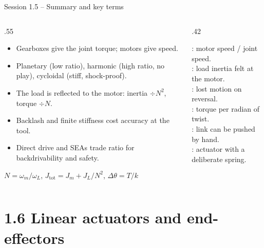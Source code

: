 \documentclass[aspectratio=169,10pt]{beamer}
\begin{document}
\begin{frame}{Session 1.5 -- Summary and key terms}
\begin{columns}[T]
\begin{column}{.55\textwidth}
\small
\begin{itemize}
\item Gearboxes give the joint torque; motors give speed.
\item Planetary (low ratio), harmonic (high ratio, no play), cycloidal (stiff, shock-proof).
\item The load is reflected to the motor: inertia $\div N^2$, torque $\div N$.
\item Backlash and finite stiffness cost accuracy at the tool.
\item Direct drive and SEAs trade ratio for backdrivability and safety.
\end{itemize}
\begin{keybox}[Remember]
$N=\omega_m/\omega_L$, \quad $J_\text{tot}=J_m+J_L/N^2$, \quad $\Delta\theta=T/k$
\end{keybox}
\end{column}
\begin{column}{.42\textwidth}
\begin{defbox}
\small
{}: motor speed / joint speed.\\
: load inertia felt at the motor.\\
: lost motion on reversal.\\
: torque per radian of twist.\\
: link can be pushed by hand.\\
: actuator with a deliberate spring.
\end{defbox}
\end{column}
\end{columns}
\end{frame}

\section{1.6 Linear actuators and end-effectors}
\end{document}

